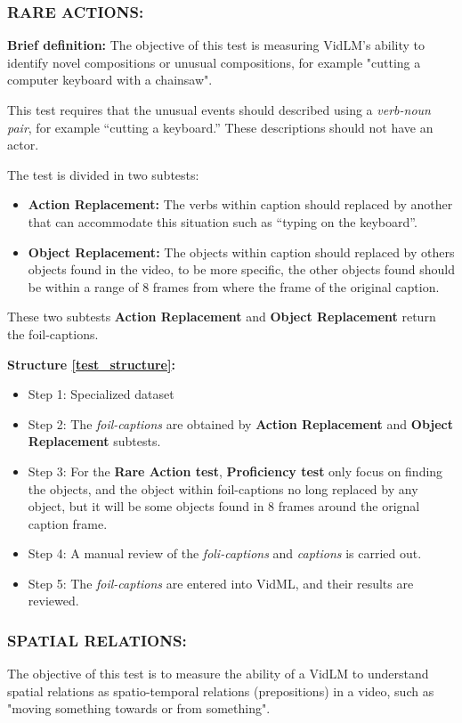 \subsubsection{RARE ACTIONS:}
\textbf{Brief definition:}
The objective of this test is measuring VidLM's ability to identify novel compositions or unusual compositions, for example "cutting a computer keyboard with a chainsaw".

This test requires that the unusual events should described using a \textit{verb-noun pair}, for example “cutting a keyboard.” These descriptions should not have an actor.

The test is divided in two subtests:
\begin{itemize}
\item \textbf{Action Replacement:} The verbs within caption should replaced by another that can accommodate this situation such as “typing on the keyboard”.
\item \textbf{Object Replacement:} The objects within caption should replaced by others objects found in the video,  to be more specific, the other objects found should be within a range of 8 frames from where the frame of the original caption.
\end{itemize}
These two subtests \textbf{Action Replacement} and \textbf{Object Replacement} return the foil-captions.

\textbf{Structure \ref{test_structure}:}
\begin{itemize}
\item Step 1: Specialized dataset
\item Step 2: The \textit{foil-captions} are obtained by \textbf{Action Replacement} and \textbf{Object Replacement} subtests.
\item Step 3: For the \textbf{Rare Action test}, \textbf{Proficiency test} only focus on finding the objects, and the object within foil-captions no long replaced by any object, but it will be some objects found in 8 frames around the orignal caption frame.
\item Step 4: A manual review of the \textit{foli-captions} and \textit{captions} is carried out.
\item Step 5: The \textit{foil-captions} are entered into VidML, and their results are reviewed.
\end{itemize}

\subsubsection{SPATIAL RELATIONS:}
The objective of this test is to measure the ability of a VidLM to understand spatial relations as spatio-temporal relations (prepositions) in a video, such as "moving something towards or from something".

